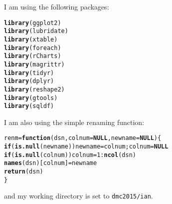 \documentclass[10pt]{article}
\makeatletter
\newcommand{\hlnum}[1]{\textcolor[rgb]{0.686,0.059,0.569}{#1}}%
\newcommand{\hlopt}[1]{\textcolor[rgb]{0,0,0}{#1}}%
\newcommand{\hlstd}[1]{\textcolor[rgb]{0.345,0.345,0.345}{#1}}%
\newcommand{\hlkwa}[1]{\textcolor[rgb]{0.161,0.373,0.58}{\textbf{#1}}}%
\newcommand{\hlkwb}[1]{\textcolor[rgb]{0.69,0.353,0.396}{#1}}%
\newcommand{\hlkwc}[1]{\textcolor[rgb]{0.333,0.667,0.333}{#1}}%
\newcommand{\hlkwd}[1]{\textcolor[rgb]{0.737,0.353,0.396}{\textbf{#1}}}%
\newenvironment{kframe}{%
 \def\at@end@of@kframe{}%
 \ifinner\ifhmode%
  \def\at@end@of@kframe{\end{minipage}}%
  \begin{minipage}{\columnwidth}%
 \fi\fi%
 \def\FrameCommand##1{\hskip\@totalleftmargin \hskip-\fboxsep
 \colorbox{shadecolor}{##1}\hskip-\fboxsep
     \hskip-\linewidth \hskip-\@totalleftmargin \hskip\columnwidth}%
 \MakeFramed {\advance\hsize-\width
   \@totalleftmargin\z@ \linewidth\hsize
   \@setminipage}}%
 {\par\unskip\endMakeFramed%
 \at@end@of@kframe}
\newenvironment{knitrout}{}{} %
\makeatother
\begin{document}
%
\begin{knitrout}
\color{fgcolor}\begin{kframe}


{\ttfamily\noindent\bfseries\color{errorcolor}{\#\# Error in makeParent(parenarticletDir = getwd(), overwrite = FALSE): unused argument (parenarticletDir = getwd())}}

{\ttfamily\noindent\bfseries\color{errorcolor}{\#\# Error in readLines(parent, warn = FALSE): object 'parent.file' not found}}\end{kframe}
\end{knitrout}


I am using the following packages:
\begin{knitrout}
\color{fgcolor}\begin{kframe}
\begin{alltt}
   \hlkwd{library}\hlstd{(ggplot2)}
   \hlkwd{library}\hlstd{(lubridate)}
   \hlkwd{library}\hlstd{(xtable)}
   \hlkwd{library}\hlstd{(foreach)}
   \hlkwd{library}\hlstd{(rCharts)}
   \hlkwd{library}\hlstd{(magrittr)}
   \hlkwd{library}\hlstd{(tidyr)}
   \hlkwd{library}\hlstd{(dplyr)}
   \hlkwd{library}\hlstd{(reshape2)}
   \hlkwd{library}\hlstd{(gtools)}
   \hlkwd{library}\hlstd{(sqldf)}
\end{alltt}
\end{kframe}
\end{knitrout}
I am also using the simple renaming function:
\begin{knitrout}
\color{fgcolor}\begin{kframe}
\begin{alltt}
   \hlstd{renm} \hlkwb{=} \hlkwa{function}\hlstd{(}\hlkwc{dsn}\hlstd{,}\hlkwc{colnum}\hlstd{=}\hlkwa{NULL}\hlstd{,}\hlkwc{newname}\hlstd{=}\hlkwa{NULL}\hlstd{)\{}
      \hlkwa{if}\hlstd{(}\hlkwd{is.null}\hlstd{(newname)) newname}\hlkwb{=}\hlstd{colnum; colnum}\hlkwb{=}\hlkwa{NULL}
      \hlkwa{if} \hlstd{(}\hlkwd{is.null}\hlstd{(colnum)) colnum} \hlkwb{=} \hlnum{1}\hlopt{:}\hlkwd{ncol}\hlstd{(dsn)}
      \hlkwd{names}\hlstd{(dsn)[colnum]} \hlkwb{=} \hlstd{newname}
      \hlkwd{return}\hlstd{(dsn)}
   \hlstd{\}}
\end{alltt}
\end{kframe}
\end{knitrout}
and my working directory is set to \verb!dmc2015/ian!.
\end{document}
